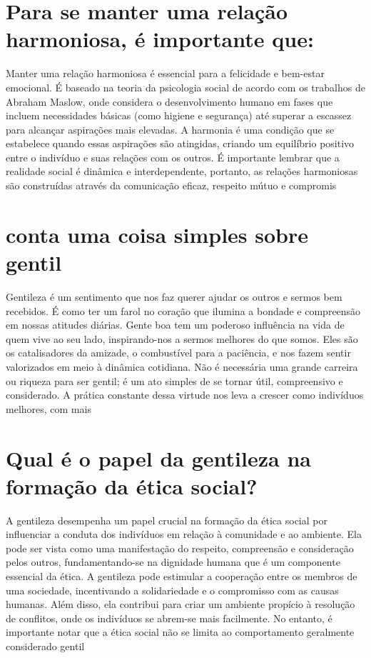 \documentclass[11pt,a4paper]{article}
\begin{document}
\section{Para se manter uma relação harmoniosa, é importante que:}
Manter uma relação harmoniosa é essencial para a felicidade e bem-estar emocional. É baseado na teoria da psicologia social de acordo com os trabalhos de Abraham Maslow, onde considera o desenvolvimento humano em fases que incluem necessidades básicas (como higiene e segurança) até superar a escassez para alcançar aspirações mais elevadas. A harmonia é uma condição que se estabelece quando essas aspirações são atingidas, criando um equilíbrio positivo entre o indivíduo e suas relações com os outros. É importante lembrar que a realidade social é dinâmica e interdependente, portanto, as relações harmoniosas são construídas através da comunicação eficaz, respeito mútuo e compromis

\section{conta uma coisa simples sobre gentil}
Gentileza é um sentimento que nos faz querer ajudar os outros e sermos bem recebidos. É como ter um farol no coração que ilumina a bondade e compreensão em nossas atitudes diárias. Gente boa tem um poderoso influência na vida de quem vive ao seu lado, inspirando-nos a sermos melhores do que somos. Eles são os catalisadores da amizade, o combustível para a paciência, e nos fazem sentir valorizados em meio à dinâmica cotidiana. Não é necessária uma grande carreira ou riqueza para ser gentil; é um ato simples de se tornar útil, compreensivo e considerado. A prática constante dessa virtude nos leva a crescer como indivíduos melhores, com mais

\section{Qual é o papel da gentileza na formação da ética social?}
A gentileza desempenha um papel crucial na formação da ética social por influenciar a conduta dos indivíduos em relação à comunidade e ao ambiente. Ela pode ser vista como uma manifestação do respeito, compreensão e consideração pelos outros, fundamentando-se na dignidade humana que é um componente essencial da ética. A gentileza pode estimular a cooperação entre os membros de uma sociedade, incentivando a solidariedade e o compromisso com as causas humanas. Além disso, ela contribui para criar um ambiente propício à resolução de conflitos, onde os indivíduos se abrem-se mais facilmente. No entanto, é importante notar que a ética social não se limita ao comportamento geralmente considerado gentil
\end{document}
